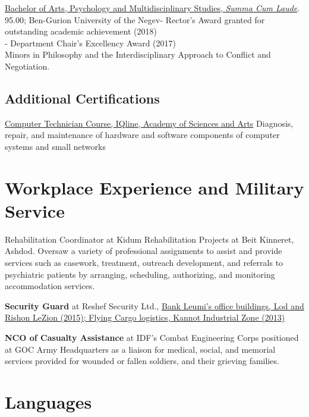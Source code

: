 {\href{https://www.dropbox.com/s/pcm0mybvgi85ma0/BA-Psych.pdf?dl=0}{Bachelor of Arts, Psychology and Multidisciplinary Studies, \textit{Summa Cum Laude}}. 95.00; Ben-Gurion University of the Negev}{- Rector's Award granted for outstanding academic achievement (2018) \\
- Department Chair’s Excellency Award (2017) \\
Minors in Philosophy and the Interdisciplinary Approach to Conflict and Negotiation.}

\subsection{Additional Certifications}
{\href{https://www.dropbox.com/s/csphxdynjdg3ze2/computer-technitian-certificate.jpg?dl=0}{Computer Technician Course, IQline, Academy of Sciences and Arts}}
{Diagnosis, repair, and maintenance of hardware and software components of computer systems and small networks}
{}

\section{Workplace Experience and Military Service}

{Rehabilitation Coordinator at Kidum Rehabilitation Projects at Beit Kinneret, Ashdod.}
{Oversaw a variety of professional assignments to assist and provide services such as casework, treatment, outreach development, and referrals to psychiatric patients by arranging, scheduling, authorizing, and monitoring accommodation services.}
{}

{\textbf{Security Guard} at Reshef Security Ltd.,} 
{\href{https://www.dropbox.com/s/kr5rcui1zgp35i0/recommendation-letter-security-guard.jpg?dl=0}{Bank Leumi's office buildings, Lod and Rishon LeZion (2015); Flying Cargo logistics, Kannot Industrial Zone (2013)}}
{}

{\textbf{NCO of Casualty Assistance} at IDF's Combat Engineering Corps} 
{positioned at GOC Army Headquarters as a liaison for medical, social, and memorial services provided for wounded or fallen soldiers, and their grieving families.}
{}

\section{Languages}

